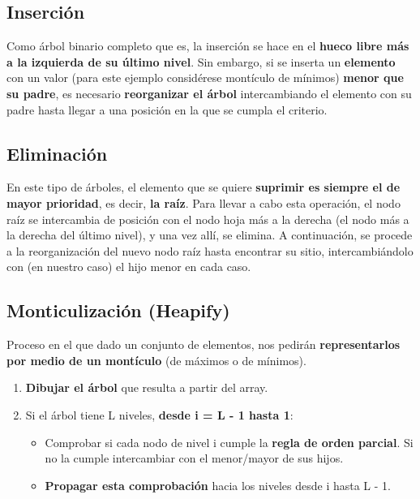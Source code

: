 \documentclass{article}
\begin{document}
\subsection{Inserción}
Como árbol binario completo que es, la inserción se hace en el \textbf{hueco libre más a la izquierda de su último nivel}. Sin embargo, si se inserta un \textbf{elemento} con un valor (para este ejemplo considérese montículo de mínimos) \textbf{menor que su padre}, es necesario \textbf{reorganizar el árbol} intercambiando el elemento con su padre hasta llegar a una posición en la que se cumpla el criterio.

\subsection{Eliminación}
En este tipo de árboles, el elemento que se quiere \textbf{suprimir es siempre el de mayor prioridad}, es decir, \textbf{la raíz}. Para llevar a cabo esta operación, el nodo raíz se intercambia de posición con el nodo hoja más a la derecha (el nodo más a la derecha del último nivel), y una vez allí, se elimina. A continuación, se procede a la reorganización del nuevo nodo raíz hasta encontrar su sitio, intercambiándolo con (en nuestro caso) el hijo menor en cada caso.

\subsection{Monticulización (Heapify)}
Proceso en el que dado un conjunto de elementos, nos pedirán \textbf{representarlos por medio de un montículo} (de máximos o de mínimos).

\begin{enumerate}
    \item \textbf{Dibujar el árbol} que resulta a partir del array.
    \item Si el árbol tiene L niveles, \textbf{desde i = L - 1 hasta 1}:
    \begin{itemize}
        \item Comprobar si cada nodo de nivel i cumple la \textbf{regla de orden parcial}. Si no la cumple intercambiar con el menor/mayor de sus hijos.
        \item \textbf{Propagar esta comprobación} hacia los niveles desde i hasta L - 1.
    \end{itemize}
\end{enumerate}
\end{document}
